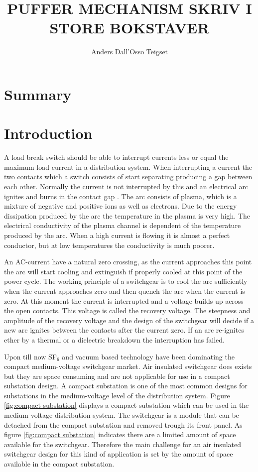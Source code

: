 \documentclass[10pt,a4paper]{article} %
\author{Anders Dall'Osso Teigset}
\title{PUFFER MECHANISM SKRIV I STORE BOKSTAVER}
\begin{document}
\maketitle
\newpage
\section{Summary}
\newpage
\tableofcontents
\newpage
\section{Introduction}
A load break switch should be able to interrupt currents less or equal the maximum load current in a distribution system. When interrupting a current the two contacts which a switch consists of start separating producing a gap between each other. Normally the current is not interrupted by this and an electrical arc ignites and burns in the contact gap \cite{bib:HVEbreak}. The arc consists of plasma, which is a mixture of negative and positive ions as well as electrons. Due to the energy dissipation produced by the arc the temperature in the plasma is very high. The electrical conductivity of the plasma channel is dependent of the temperature produced by the arc. When a high current is flowing it is almost a perfect conductor, but at low temperatures the conductivity is much poorer.

An AC-current have a natural zero crossing, as the current approaches this point the arc will start cooling and extinguish if properly cooled at this point of the power cycle. The working principle of a switchgear is to cool the arc sufficiently when the current approaches zero and then quench the arc when the current is zero. At this moment the current is interrupted and a voltage builds up across the open contacts. This voltage is called the recovery voltage. The steepness and amplitude of the recovery voltage \cite{bib:HVEbreak} and the design of the switchgear will decide if a new arc ignites between the contacts after the current zero. If an arc re-ignites ether by a thermal or a dielectric breakdown the interruption has failed. 

Upon till now SF$_6$ and vacuum based technology have been dominating the compact medium-voltage switchgear market. Air insulated switchgear does exists but they are space consuming and are not applicable for use in a compact substation design. A compact substation is one of the most common designs for substations in the medium-voltage level of the distribution system. Figure \ref{fig:compact substation} displays a compact substation which can be used in the medium-voltage distribution system. The switchgear is a module that can be detached from the compact substation and removed trough its front panel. As figure \ref{fig:compact substation} indicates there are a limited amount of space available for the switchgear. Therefore the main challenge for an air insulated switchgear design for this kind of application is set by the amount of space available in the compact substation.
\end{document}
